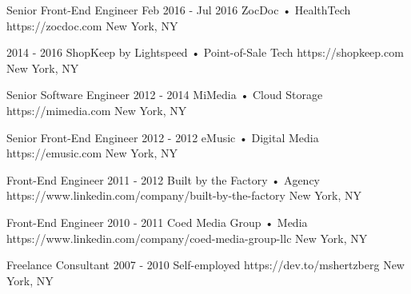 \documentclass{resume}
\begin{document}
\resumeCompany
    {Senior Front-End Engineer}
    {Feb 2016 - Jul 2016}
    {ZocDoc • HealthTech}
    {https://zocdoc.com}
    {New York, NY}

\vspace{6pt}
    {2014 - 2016}
    {ShopKeep by Lightspeed • Point-of-Sale Tech}
    {https://shopkeep.com}
    {New York, NY}

\resumeBriefCompany
    {Senior Software Engineer}
    {2012 - 2014}
    {MiMedia • Cloud Storage}
    {https://mimedia.com}
    {New York, NY}

\resumeBriefCompany
    {Senior Front-End Engineer}
    {2012 - 2012}
    {eMusic • Digital Media}
    {https://emusic.com}
    {New York, NY}

\resumeBriefCompany
    {Front-End Engineer}
    {2011 - 2012}
    {Built by the Factory • Agency}
    {https://www.linkedin.com/company/built-by-the-factory}
    {New York, NY}

\resumeBriefCompany
    {Front-End Engineer}
    {2010 - 2011}
    {Coed Media Group • Media}
    {https://www.linkedin.com/company/coed-media-group-llc}
    {New York, NY}

\resumeBriefCompany
    {Freelance Consultant}
    {2007 - 2010}
    {Self-employed}
    {https://dev.to/mshertzberg}
    {New York, NY}

\end{document}
